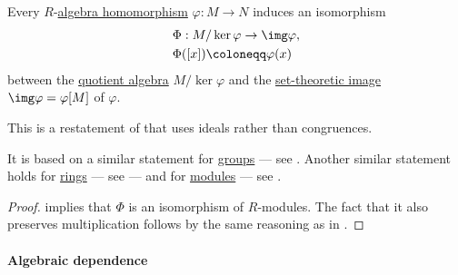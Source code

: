 \begin{theorem}\label{thm:homomorphism_theorem_for_algebras}
  Every \( R \)-\hyperref[def:algebra_over_ring/morphism]{algebra homomorphism} \( {\varphi: M \to N} \) induces an isomorphism
  \begin{equation*}
    \begin{aligned}
      &\Phi: M / \ker \varphi \to \img \varphi, \\
      &\Phi([x]) \coloneqq \varphi(x)
    \end{aligned}
  \end{equation*}
  between the \hyperref[def:algebra_over_ring/quotient]{quotient algebra} \( M / \ker \varphi \) and the \hyperref[def:set_valued_function/image]{set-theoretic image} \( \img \varphi = \varphi[M] \) of \( \varphi \).
\end{theorem}
\begin{comments}
  \item This is a restatement of  that uses ideals rather than congruences.

  It is based on a similar statement for \hyperref[def:group]{groups} --- see . Another similar statement holds for \hyperref[def:ring]{rings} --- see  --- and for \hyperref[def:module]{modules} --- see .
\end{comments}
\begin{proof}
   implies that \( \Phi \) is an isomorphism of \( R \)-modules. The fact that it also preserves multiplication follows by the same reasoning as in .
\end{proof}

\paragraph{Algebraic dependence}

